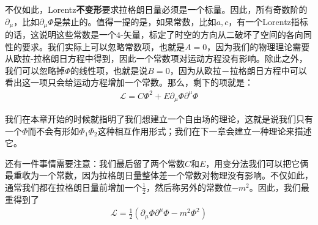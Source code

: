 不仅如此，Lorentz{\bf 不变形}要求拉格朗日量必须是一个标量。因此，所有奇数阶的$\partial_\mu$，比如$\partial_\mu\Phi$是禁止的。值得一提的是，如果常数，比如$a, c$，有一个Lorentz指标的话，这说明这些常数是一个$4$-矢量，标定了时空的方向从二破坏了空间的各向同性的要求。我们实际上可以忽略常数项，也就是$A=0$，因为我们的物理理论需要从欧拉-拉格朗日方程中得到，因此一个常数项对运动方程没有影响。除此之外，我们可以忽略掉$\Phi$的线性项，也就是说$B=0$，因为从欧拉－拉格朗日方程中可以看出这一项只会给运动方程增加一个常数。那么，剩下的项就是：
\begin{align}
\mathscr{L}=C\Phi^2+E\partial_\mu\Phi\partial^\mu\Phi
\end{align}

我们在本章开始的时候就指明了我们想建立一个自由场的理论，这就是说我们只有一个$\Phi$而不会有形如$\Phi_1\Phi_2$这种相互作用形式；我们在下一章会建立一种理论来描述它。

还有一件事情需要注意：我们最后留了两个常数$C$和$E$，用变分法我们可以把它俩最重收为一个常数，因为拉格朗日量整体差一个常数对物理没有影响。不仅如此，通常我们都在拉格朗日量前增加一个$\frac{1}{2}$，然后称另外的常数位$-m^2$。因此，我们最重得到了
\begin{align}
\mathscr{L}=\frac{1}{2}(\partial_\mu\Phi\partial^\mu\Phi-m^2\Phi^2)
\end{align}

